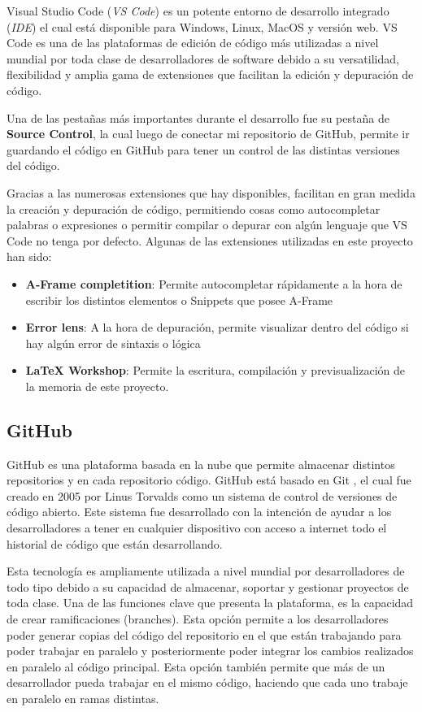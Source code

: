 \documentclass[a4paper, 12pt]{book}
\begin{document}
Visual Studio Code (\textit{VS Code}) es un potente entorno de desarrollo integrado (\textit{IDE}) el cual está disponible para Windows, Linux, MacOS y versión web. VS Code es una de las plataformas de edición de código más utilizadas a nivel mundial 
por toda clase de desarrolladores de software debido a su versatilidad, flexibilidad y amplia gama de extensiones que facilitan la edición y depuración de código.

Una de las pestañas más importantes durante el desarrollo fue su pestaña de \textbf{Source Control}, la cual luego de conectar mi repositorio de GitHub, permite ir guardando el código en GitHub para tener un control de las distintas versiones del código. 

Gracias a las numerosas extensiones que hay disponibles, facilitan en gran medida la creación y depuración de código, permitiendo cosas como autocompletar palabras o expresiones o permitir compilar o depurar con algún lenguaje que VS Code no tenga por defecto.
Algunas de las extensiones utilizadas en este proyecto han sido: 
\begin{itemize}
  \item \textbf{A-Frame completition}: Permite autocompletar rápidamente a la hora de escribir los distintos elementos o Snippets que posee A-Frame
  \item \textbf{Error lens}: A la hora de depuración, permite visualizar dentro del código si hay algún error de sintaxis o lógica 
  \item \textbf{LaTeX Workshop}: Permite la escritura, compilación y previsualización de la memoria de este proyecto.
\end{itemize}

\subsection{GitHub}
\label{subsect:github}

GitHub es una plataforma basada en la nube que permite almacenar distintos repositorios y en cada repositorio código. GitHub está basado en Git \cite{git}, el cual fue creado en 2005 por Linus Torvalds como un sistema de control de versiones de código abierto.
Este sistema fue desarrollado con la intención de ayudar a los desarrolladores a tener en cualquier dispositivo con acceso a internet todo el historial de código que están desarrollando. 

Esta tecnología es ampliamente utilizada a nivel mundial por desarrolladores de todo tipo debido a su capacidad de almacenar, soportar y gestionar proyectos de toda clase. Una de las funciones clave que presenta la plataforma, es la capacidad de crear ramificaciones (branches). Esta opción permite a los desarrolladores poder generar copias del código del repositorio en el que 
están trabajando para poder trabajar en paralelo y posteriormente poder integrar los cambios realizados en paralelo al código principal. Esta opción también permite que más de un desarrollador pueda trabajar en el mismo código, haciendo que cada uno trabaje en paralelo en ramas distintas. 
\end{document}
